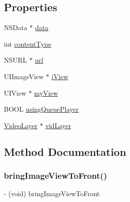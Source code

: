 \subsection*{Properties}
\begin{DoxyCompactItemize}
\item 
N\+S\+Data $\ast$ \hyperlink{interface_content_displayer_a271c75b6c7eae098d25223b989e78e9e}{data}
\item 
int \hyperlink{interface_content_displayer_a0d19b1773442e481626b142d0a23fe72}{content\+Type}
\item 
N\+S\+U\+RL $\ast$ \hyperlink{interface_content_displayer_ac8cd5e3d377ad4c158ad8a8f690abde4}{url}
\item 
U\+I\+Image\+View $\ast$ \hyperlink{interface_content_displayer_a88ae9e71a5bf3e3317b719a9ed24ef6e}{i\+View}
\item 
U\+I\+View $\ast$ \hyperlink{interface_content_displayer_a25ed98fdc92fda41a7c53829f5d05b4b}{my\+View}
\item 
B\+O\+OL \hyperlink{interface_content_displayer_a66c3907833921bd7750a58467ce01661}{using\+Queue\+Player}
\item 
\hyperlink{interface_video_layer}{Video\+Layer} $\ast$ \hyperlink{interface_content_displayer_afe0c54fd8098df7af42a160113ec6e34}{vid\+Layer}
\end{DoxyCompactItemize}


\subsection{Method Documentation}
\hypertarget{interface_content_displayer_a135fda747e1b224c270d52c0a5ca79b8}{}\label{interface_content_displayer_a135fda747e1b224c270d52c0a5ca79b8} 
\subsubsection{\texorpdfstring{bring\+Image\+View\+To\+Front()}{bringImageViewToFront()}}
{\footnotesize\ttfamily -\/ (void) bring\+Image\+View\+To\+Front \begin{DoxyParamCaption}{ }\end{DoxyParamCaption}}

\hypertarget{interface_content_displayer_a15b41b0fc1e213541ec61ff3da5bb2c5}{}\label{interface_content_displayer_a15b41b0fc1e213541ec61ff3da5bb2c5} 
